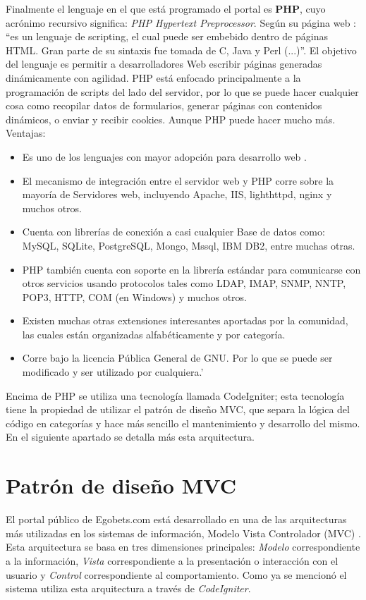 Finalmente el lenguaje en el que está programado el portal es \textbf{PHP}, cuyo acrónimo recursivo significa: \emph{PHP Hypertext Preprocessor}. Según su página web \cite{phpWeb}: ``es un lenguaje de scripting, el cual puede ser embebido dentro de páginas HTML. Gran parte de su sintaxis fue tomada de C, Java y Perl (...)''. El objetivo del lenguaje es permitir a desarrolladores Web escribir páginas generadas dinámicamente con agilidad.
PHP está enfocado principalmente a la programación de scripts del lado del servidor, por lo que se puede hacer cualquier cosa como recopilar datos de formularios, generar páginas con contenidos dinámicos, o enviar y recibir cookies. Aunque PHP puede hacer mucho más.
				 Ventajas:
	\begin{itemize}
		\item Es uno de los lenguajes con mayor adopción para desarrollo web \cite{tiobeIndex}.
		\item El mecanismo de integración entre el servidor web y PHP corre sobre la mayoría de Servidores web, incluyendo Apache, IIS, lighthttpd, nginx y muchos otros.
		\item Cuenta con librerías de conexión a casi cualquier Base de datos como: MySQL, SQLite, PostgreSQL, Mongo, Mssql, IBM DB2, entre muchas otras.
		\item PHP también cuenta con soporte en la librería estándar para comunicarse con otros servicios usando protocolos tales como LDAP, IMAP, SNMP, NNTP, POP3, HTTP, COM (en Windows) y muchos otros.
		\item Existen muchas otras extensiones interesantes aportadas por la comunidad, las cuales están organizadas alfabéticamente y por categoría.
		\item Corre bajo la licencia Pública General de GNU. Por lo que se puede ser modificado y ser utilizado por cualquiera.'
	\end{itemize}

Encima de PHP se utiliza una tecnología llamada CodeIgniter; esta tecnología tiene la propiedad de utilizar el patrón de diseño MVC, que separa la lógica del código en categorías y hace más sencillo el mantenimiento y desarrollo del mismo. En el siguiente apartado se detalla más esta arquitectura.

\section{Patrón de diseño MVC}

El portal público de Egobets.com está desarrollado en una de las arquitecturas más utilizadas en los sistemas de información, Modelo Vista Controlador (MVC) \cite{alfredo2005ingenieria}. Esta arquitectura se basa en tres dimensiones principales: \emph{Modelo} correspondiente a la información, \emph{Vista} correspondiente a la presentación o interacción con el usuario y \emph{Control} correspondiente al comportamiento. Como ya se mencionó el sistema utiliza esta arquitectura a través de \emph{CodeIgniter}.

